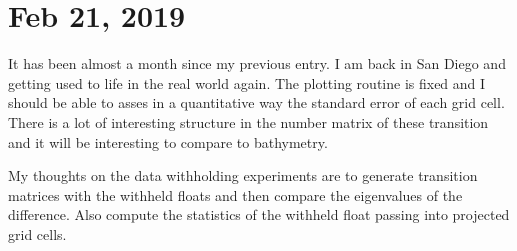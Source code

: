 \documentclass[english]{article}
\begin{document}
\section{Feb 21, 2019}
It has been almost a month since my previous entry. I am back in San Diego and getting used to life in the real world again. The plotting routine is fixed and I should be able to asses in a quantitative way the standard error of each grid cell. There is a lot of interesting structure in the number matrix of these transition and it will be interesting to compare to bathymetry.

My thoughts on the data withholding experiments are to generate transition matrices with the withheld floats and then compare the eigenvalues of the difference. Also compute the statistics of the withheld float passing into projected grid cells.
\end{document}
